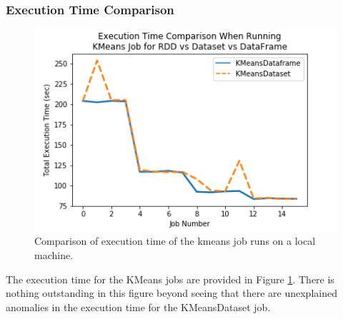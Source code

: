 \documentclass[conference]{IEEEtran}
\begin{document}
\subsubsection{Execution Time Comparison}
\begin{figure}
    \includegraphics[width=\linewidth]{../python_scripts/images/kmeansJobAllExecutionTime.png}
    \caption{Comparison of execution time of the kmeans job runs on a local machine.}
    \label{fig:kmeansJobAllExecutionTime}
\end{figure}

The execution time for the KMeans jobs are provided in Figure \ref{fig:kmeansJobAllExecutionTime}.
There is nothing outstanding in this figure beyond seeing that there are unexplained anomalies in the execution time for the KMeansDataset job.
\end{document}
